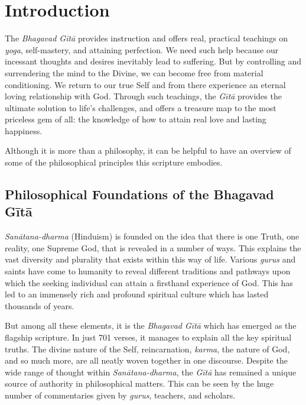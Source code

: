 \chapter{Introduction}\label{chap-introduction}

\bigskip

The \textit{Bhagavad Gītā} provides instruction and offers real, practical teachings on \textit{yoga}, self-mastery, and attaining perfection. We need such help because our incessant thoughts and desires inevitably lead to suffering. But by controlling and surrendering the mind to the Divine, we can become free from material conditioning. We return to our true Self and from there experience an eternal loving relationship with God. Through such teachings, the \textit{Gītā} provides the ultimate solution to life’s challenges, and offers a treasure map to the most priceless gem of all: the knowledge of how to attain real love and lasting happiness.

Although it is more than a philosophy, it can be helpful to have an overview of some of the philosophical principles this scripture embodies.

\section{Philosophical Foundations of the Bhagavad Gītā}\label{sec-philosophical-foundations-of-the-bhagavad-gita}

\textit{Sanātana-dharma} (Hinduism) is founded on the idea that there is one Truth, one reality, one Supreme God, that is revealed in a number of ways. This explains the vast diversity and plurality that exists within this way of life. Various \textit{gurus} and saints have come to humanity to reveal different traditions and pathways upon which the seeking individual can attain a firsthand experience of God. This has led to an immensely rich and profound spiritual culture which has lasted thousands of years.

But among all these elements, it is the \textit{Bhagavad Gītā} which has emerged as the flagship scripture. In just 701 verses, it manages to explain all the key spiritual truths. The divine nature of the Self, reincarnation, \textit{karma}, the nature of God, and so much more, are all neatly woven together in one discourse. Despite the wide range of thought within \textit{Sanātana-dharma}, the \textit{Gītā} has remained a unique source of authority in philosophical matters. This can be seen by the huge number of commentaries given by \textit{gurus}, teachers, and scholars.

